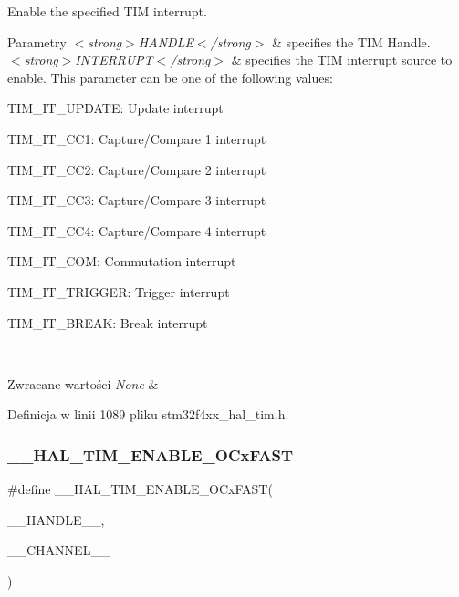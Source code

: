 Enable the specified T\+IM interrupt. 


\begin{DoxyParams}{Parametry}
{\em $<$strong$>$\+H\+A\+N\+D\+L\+E$<$/strong$>$} & specifies the T\+IM Handle. \\
\hline
{\em $<$strong$>$\+I\+N\+T\+E\+R\+R\+U\+P\+T$<$/strong$>$} & specifies the T\+IM interrupt source to enable. This parameter can be one of the following values\+: \begin{DoxyItemize}
\item T\+I\+M\+\_\+\+I\+T\+\_\+\+U\+P\+D\+A\+TE\+: Update interrupt \item T\+I\+M\+\_\+\+I\+T\+\_\+\+C\+C1\+: Capture/\+Compare 1 interrupt \item T\+I\+M\+\_\+\+I\+T\+\_\+\+C\+C2\+: Capture/\+Compare 2 interrupt \item T\+I\+M\+\_\+\+I\+T\+\_\+\+C\+C3\+: Capture/\+Compare 3 interrupt \item T\+I\+M\+\_\+\+I\+T\+\_\+\+C\+C4\+: Capture/\+Compare 4 interrupt \item T\+I\+M\+\_\+\+I\+T\+\_\+\+C\+OM\+: Commutation interrupt \item T\+I\+M\+\_\+\+I\+T\+\_\+\+T\+R\+I\+G\+G\+ER\+: Trigger interrupt \item T\+I\+M\+\_\+\+I\+T\+\_\+\+B\+R\+E\+AK\+: Break interrupt \end{DoxyItemize}
\\
\hline
\end{DoxyParams}

\begin{DoxyRetVals}{Zwracane wartości}
{\em None} & \\
\hline
\end{DoxyRetVals}


Definicja w linii 1089 pliku stm32f4xx\+\_\+hal\+\_\+tim.\+h.

\mbox{\label{group___t_i_m___exported___macros_ga390795eb198214e5d4ed235ae3f751e4}} 
\subsubsection{\texorpdfstring{\+\_\+\+\_\+\+H\+A\+L\+\_\+\+T\+I\+M\+\_\+\+E\+N\+A\+B\+L\+E\+\_\+\+O\+Cx\+F\+A\+ST}{\_\_HAL\_TIM\_ENABLE\_OCxFAST}}
{\footnotesize\ttfamily \#define \+\_\+\+\_\+\+H\+A\+L\+\_\+\+T\+I\+M\+\_\+\+E\+N\+A\+B\+L\+E\+\_\+\+O\+Cx\+F\+A\+ST(\begin{DoxyParamCaption}\item[{}]{\+\_\+\+\_\+\+H\+A\+N\+D\+L\+E\+\_\+\+\_\+,  }\item[{}]{\+\_\+\+\_\+\+C\+H\+A\+N\+N\+E\+L\+\_\+\+\_\+ }\end{DoxyParamCaption})}

